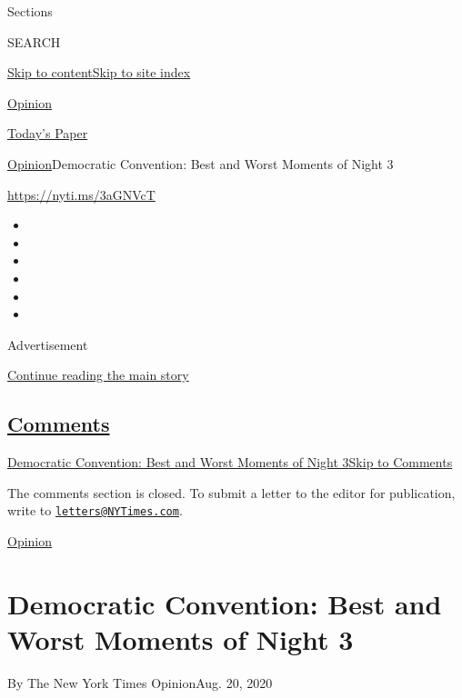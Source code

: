 Sections

SEARCH

\protect\hyperlink{site-content}{Skip to
content}\protect\hyperlink{site-index}{Skip to site index}

\href{https://www.nytimes3xbfgragh.onion/section/opinion}{Opinion}

\href{https://myaccount.nytimes3xbfgragh.onion/auth/login?response_type=cookie\&client_id=vi}{}

\href{https://www.nytimes3xbfgragh.onion/section/todayspaper}{Today's
Paper}

\href{/section/opinion}{Opinion}\textbar{}Democratic Convention: Best
and Worst Moments of Night 3

\url{https://nyti.ms/3aGNVcT}

\begin{itemize}
\item
\item
\item
\item
\item
\item
\end{itemize}

Advertisement

\protect\hyperlink{after-top}{Continue reading the main story}

\hypertarget{comments}{%
\subsection{\texorpdfstring{\protect\hyperlink{commentsContainer}{Comments}}{Comments}}\label{comments}}

\href{}{Democratic Convention: Best and Worst Moments of Night
3}\href{}{Skip to Comments}

The comments section is closed. To submit a letter to the editor for
publication, write to
\href{mailto:letters@NYTimes.com}{\nolinkurl{letters@NYTimes.com}}.

\href{/section/opinion}{Opinion}

\hypertarget{democratic-convention-best-and-worst-moments-of-night-3}{%
\section{Democratic Convention: Best and Worst Moments of Night
3}\label{democratic-convention-best-and-worst-moments-of-night-3}}

By The New York Times OpinionAug. 20, 2020

